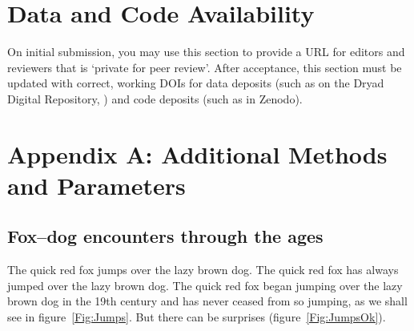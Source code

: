 \documentclass[11pt]{article}\usepackage[sc]{mathpazo} %
\begin{document}
\section*{Data and Code Availability}

On initial submission, you may use this section to provide a URL for editors and reviewers that is `private for peer review'. After acceptance, this section must be updated with correct, working DOIs for data deposits (such as on the Dryad Digital Repository, \citealt{CookEtAl2015}) and code deposits (such as in Zenodo). 

\section*{Appendix A: Additional Methods and Parameters}

%
%
%
%

\renewcommand{\theequation}{A\arabic{equation}}
\renewcommand{\thetable}{A\arabic{table}}
\setcounter{equation}{0}  %
\setcounter{figure}{0}
\setcounter{table}{0}

\subsection*{Fox--dog encounters through the ages}

The quick red fox jumps over the lazy brown dog. The quick red fox has always jumped over the lazy brown dog. The quick red fox began jumping over the lazy brown dog in the 19th century and has never ceased from so jumping, as we shall see in figure~\ref{Fig:Jumps}. But there can be surprises (figure~\ref{Fig:JumpsOk}).
\end{document}
